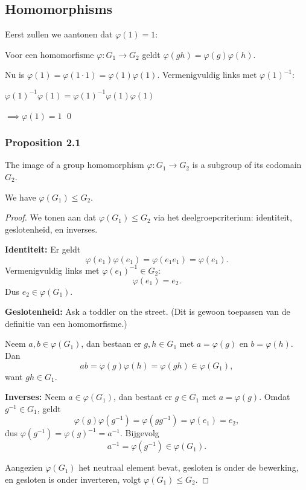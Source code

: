 \subsection{Homomorphisms}

Eerst zullen we aantonen dat \(\varphi(1) = 1\):

Voor een homomorfisme \(\varphi: G_1 \to G_2\) geldt \(\varphi(gh) = \varphi(g)\varphi(h)\).

Nu is \(\varphi(1) = \varphi(1 \cdot 1) = \varphi(1)\varphi(1)\). Vermenigvuldig links met \(\varphi(1)^{-1}\):

\(\varphi(1)^{-1}\varphi(1) = \varphi(1)^{-1}\varphi(1)\varphi(1)\)

\(\implies \varphi(1) = 1\)
\qed

\subsubsection{Proposition 2.1}

\begin{proposition}
    The image of a group homomorphism $\varphi: G_1 \to G_2$ is a subgroup of its codomain $G_2$.

    We have \(\varphi(G_1) \leq G_2\).
\end{proposition}

\begin{proof}
    We tonen aan dat $\varphi(G_1) \leq G_2$ via het deelgroepcriterium: identiteit, geslotenheid, en inverses.

    \textbf{Identiteit:} Er geldt
    \[
        \varphi(e_1)\varphi(e_1) = \varphi(e_1 e_1) = \varphi(e_1).
    \]
    Vermenigvuldig links met $\varphi(e_1)^{-1} \in G_2$:
    \[
        \varphi(e_1) = e_2.
    \]
    Dus $e_2 \in \varphi(G_1)$.

    \textbf{Geslotenheid:} Ask a toddler on the street. (Dit is gewoon toepassen van de definitie van een homomorfisme.)
    
    Neem $a, b \in \varphi(G_1)$, dan bestaan er $g, h \in G_1$ met $a = \varphi(g)$ en $b = \varphi(h)$. Dan
    \[
        ab = \varphi(g)\varphi(h) = \varphi(gh) \in \varphi(G_1),
    \]
    want $gh \in G_1$.

    \textbf{Inverses:} Neem $a \in \varphi(G_1)$, dan bestaat er $g \in G_1$ met $a = \varphi(g)$. Omdat $g^{-1} \in G_1$, geldt
    \[
        \varphi(g)\varphi(g^{-1}) = \varphi(gg^{-1}) = \varphi(e_1) = e_2,
    \]
    dus $\varphi(g^{-1}) = \varphi(g)^{-1} = a^{-1}$. Bijgevolg
    \[
        a^{-1} = \varphi(g^{-1}) \in \varphi(G_1).
    \]

    Aangezien $\varphi(G_1)$ het neutraal element bevat, gesloten is onder de bewerking, en gesloten is onder inverteren, volgt $\varphi(G_1) \leq G_2$.
\end{proof}